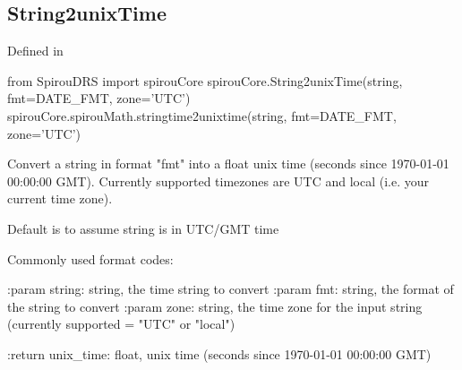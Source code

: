 \noindent\begin{minipage}{\textwidth}
\subsection{String2unixTime}

Defined in \spirouCore{}

\begin{pythonbox}
from SpirouDRS import spirouCore
spirouCore.String2unixTime(string, fmt=DATE_FMT, zone='UTC')
spirouCore.spirouMath.stringtime2unixtime(string, fmt=DATE_FMT, zone='UTC')
\end{pythonbox}

\begin{pythondocstring}
Convert a string in format "fmt" into a float unix time (seconds since
1970-01-01 00:00:00 GMT). Currently supported timezones are UTC and local
(i.e. your current time zone).

Default is to assume string is in UTC/GMT time

Commonly used format codes:


:param string: string, the time string to convert
:param fmt: string, the format of the string to convert
:param zone: string, the time zone for the input string
                      (currently supported =  "UTC" or "local")

:return unix_time: float, unix time (seconds since 1970-01-01 00:00:00 GMT)
\end{pythondocstring}
\end{minipage}

